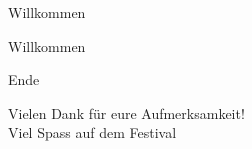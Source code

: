 \documentclass[12pt,hyperref={pdfpagelabels=false},notes=show,aspectratio=169]{beamer}
\begin{document}

\begin{frame}{Willkommen}
    \begin{center}
        Willkommen
    \end{center}
\end{frame}






\begin{frame}{Ende}
    \begin{center}
        Vielen Dank für eure Aufmerksamkeit!\\
        \vfill
        Viel Spass auf dem Festival
     \end{center}
\end{frame}\addtocounter{framenumber}{-1}

\end{document}
